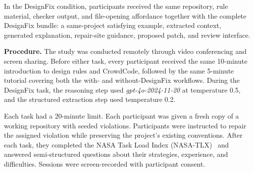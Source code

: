 In the DesignFix condition, participants received the same repository,
rule material, checker output, and file-opening affordance together
with the complete DesignFix bundle: a same-project satisfying example,
extracted context, generated explanation, repair-site guidance,
proposed patch, and review interface. 



\textbf{Procedure.}
The study was conducted remotely through video conferencing and screen
sharing. Before either task, every participant received the same
10-minute introduction to design rules and CrowdCode, followed by the
same 5-minute tutorial covering both the with- and without-DesignFix
workflows.
During the DesignFix task, the reasoning step used
\textit{gpt-4o-2024-11-20} at temperature 0.5, and the structured
extraction step used temperature 0.2.

Each task had a 20-minute limit. Each participant was given a fresh copy of a working repository with seeded violations. 
Participants were instructed to repair the assigned violation while
preserving the project's existing conventions. After each task, they
completed the NASA Task Load Index (NASA-TLX)~\cite{hart1988development}
and answered semi-structured questions
about their strategies, experience, and difficulties. Sessions were
screen-recorded with participant consent.

